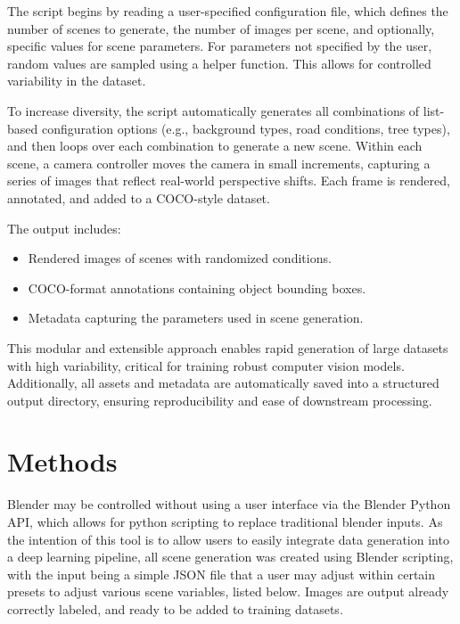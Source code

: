 \documentclass[journal]{IEEEtran}
\begin{document}
 The script begins by reading a user-specified configuration file, which defines the number of scenes to generate, the number of images per scene, and optionally, specific values for scene parameters. For parameters not specified by the user, random values are sampled using a helper function. This allows for controlled variability in the dataset.
 
 To increase diversity, the script automatically generates all combinations of list-based configuration options (e.g., background types, road conditions, tree types), and then loops over each combination to generate a new scene. Within each scene, a camera controller moves the camera in small increments, capturing a series of images that reflect real-world perspective shifts. Each frame is rendered, annotated, and added to a COCO-style dataset.
 
 The output includes:
 \begin{itemize}
     \item Rendered images of scenes with randomized conditions.
     \item COCO-format annotations containing object bounding boxes.
     \item Metadata capturing the parameters used in scene generation.
 \end{itemize}
 
 This modular and extensible approach enables rapid generation of large datasets with high variability, critical for training robust computer vision models. Additionally, all assets and metadata are automatically saved into a structured output directory, ensuring reproducibility and ease of downstream processing.

 \section{Methods}
Blender may be controlled without using a user interface via the Blender Python API, which allows for python scripting to replace traditional blender inputs. As the intention of this tool is to allow users to easily integrate data generation into a deep learning pipeline, all scene generation was created using Blender scripting, with the input being a simple JSON file that a user may adjust within certain presets to adjust various scene variables, listed below. Images are output already correctly labeled, and ready to be added to training datasets. 
\end{document}
